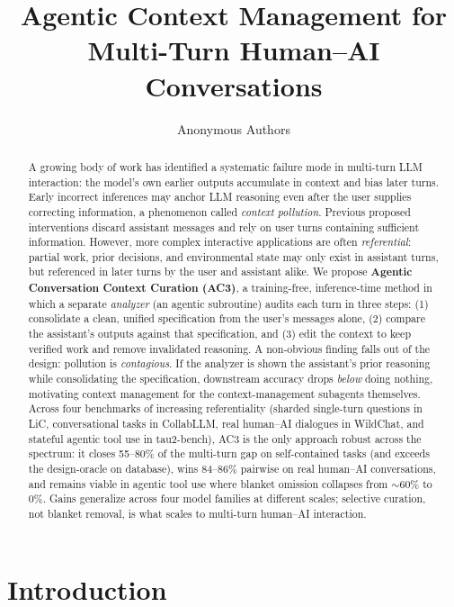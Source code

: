 \documentclass{article}
\title{Agentic Context Management for Multi-Turn Human--AI Conversations}
\author{%
  Anonymous Authors
}
\newcommand{\methodfull}{Agentic Conversation Context Curation\xspace}
\newcommand{\method}{AC3\xspace}
\begin{document}
\maketitle

\begin{abstract}
A growing body of work has identified a systematic failure mode in multi-turn LLM interaction: the model's own earlier outputs accumulate in context and bias later turns. Early incorrect inferences may anchor LLM reasoning even after the user supplies correcting information, a phenomenon called \emph{context pollution}. Previous proposed interventions discard assistant messages and rely on user turns containing sufficient information. However, more complex interactive applications are often \emph{referential}: partial work, prior decisions, and environmental state may only exist in assistant turns, but referenced in later turns by the user and assistant alike. We propose \textbf{\methodfull{} (\method)}, a training-free, inference-time method in which a separate \emph{analyzer} (an agentic subroutine) audits each turn in three steps: (1) consolidate a clean, unified specification from the user's messages alone, (2) compare the assistant's outputs against that specification, and (3) edit the context to keep verified work and remove invalidated reasoning. A non-obvious finding falls out of the design: pollution is \emph{contagious}. If the analyzer is shown the assistant's prior reasoning while consolidating the specification, downstream accuracy drops \emph{below} doing nothing, motivating context management for the context-management subagents themselves. Across four benchmarks of increasing referentiality (sharded single-turn questions in LiC, conversational tasks in CollabLLM, real human--AI dialogues in WildChat, and stateful agentic tool use in tau2-bench), \method is the only approach robust across the spectrum: it closes 55--80\% of the multi-turn gap on self-contained tasks (and exceeds the design-oracle on database), wins 84--86\% pairwise on real human--AI conversations, and remains viable in agentic tool use where blanket omission collapses from $\sim$60\% to 0\%. Gains generalize across four model families at different scales; selective curation, not blanket removal, is what scales to multi-turn human--AI interaction.
\end{abstract}


\section{Introduction}
\label{sec:intro}
\end{document}
